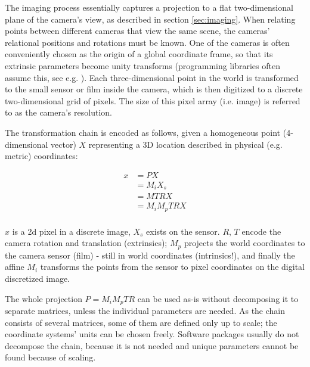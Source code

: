 
The imaging process essentially captures a projection to a flat two-dimensional plane of the camera's view, as described in section \ref{sec:imaging}.
When relating points between different cameras that view the same scene, the cameras' relational positions and rotations must be known.
One of the cameras is often conveniently chosen as the origin of a global coordinate frame, so that its extrinsic parameters become unity transforms (programming libraries often assume this, see e.g. \cite{opencv}).
Each three-dimensional point in the world is transformed to the small sensor or film inside the camera, which is then digitized to a discrete two-dimensional grid of pixels. The size of this pixel array (i.e. image) is referred to as the camera's resolution.


The transformation chain is encoded as follows, given a homogeneous point (4-dimensional vector) $X$ representing a 3D location described in physical (e.g. metric) coordinates:

\begin{align}
	x &= P X\\
	  &= M_i X_s\\ %
	  &= M T R X\\
	  &= M_i M_p T R X\\ %
\end{align}

$x$ is a 2d pixel in a discrete image, $X_s$ exists on the sensor. $R$, $T$ encode the camera rotation and translation (extrinsics); $M_p$ projects the world coordinates to the camera sensor (film) - still in world coordinates (intrinsics!), and finally the affine $M_i$ transforms the points from the sensor to pixel coordinates on the digital discretized image.

The whole projection $P = M_i M_p T R$ can be used as-is without decomposing it to separate matrices, unless the individual parameters are needed. As the chain consists of several matrices, some of them are defined only up to scale; the coordinate systems' units can be chosen freely. Software packages usually do not decompose the chain, because it is not needed and unique parameters cannot be found because of scaling.


